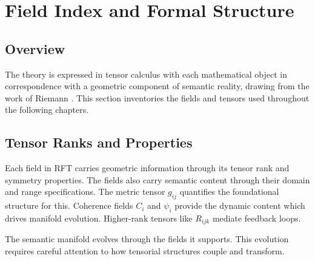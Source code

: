 \chapter{Field Index and Formal Structure}

\section{Overview}

The theory is expressed in tensor calculus with each mathematical object in correspondence with a geometric component of semantic reality, drawing from the work of Riemann \autocite{Riemann1868}. This section inventories the fields and tensors used throughout the following chapters.

\section{Tensor Ranks and Properties}

Each field in RFT carries geometric information through its tensor rank and symmetry properties. The fields also carry semantic content through their domain and range specifications. The metric tensor \(g_{ij}\) quantifies the foundational structure for this. Coherence fields \(C_i\) and \(\psi_i\) provide the dynamic content which drives manifold evolution. Higher-rank tensors like \(R_{ijk}\) mediate feedback loops.

The semantic manifold evolves through the fields it supports. This evolution requires careful attention to how tensorial structures couple and transform.

